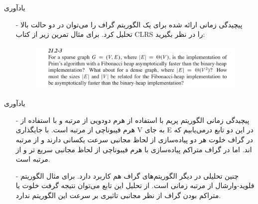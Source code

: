 \begin{frame}{يادآوری}
\begin{itemize}\itemr
\item[-]
پیچیدگی زمانی ارائه شده برای یک الگوریتم گراف را می‌توان در دو حالت بالا تحلیل کرد. برای مثال تمرین زیر از کتاب CLRS را در نظر بگیرید:

\begin{figure}[h!]
\centering
\includegraphics[width=\textwidth]{figs/chap02/2.png}
\end{figure}

\end{itemize}
\end{frame}

\begin{frame}{يادآوری}
\begin{itemize}\itemr
\item[-]
پیچیدگی زمانی الگوریتم پریم با استفاده از هرم دودویی از مرتبه
و با استفاده از هرم فیبوناچی از مرتبه
است. با جایگذاری V به جای E در این دو تابع درمی‌یابیم که در گراف خلوت هر دو پیاده‌سازی‌ از لحاظ مجانبی سرعت یکسانی دارند و از مرتبه
اند. اما در گراف متراکم پیاده‌سازی با هرم فیبوناچی از لحاظ مجانبی سریع تر و از مرتبه
 است.
\item[-]
چنین تحلیلی در دیگر الگوریتم‌‌های گراف هم کاربرد دارد. برای مثال الگوریتم فلوید-وارشال از مرتبه زمانی
 است. از تحلیل این تابع می‌توان نتیجه گرفت خلوت یا متراکم بودن گراف از نظر مجانبی تاثیری بر سرعت این الگوریتم ندارد.
\end{itemize}
\end{frame}



